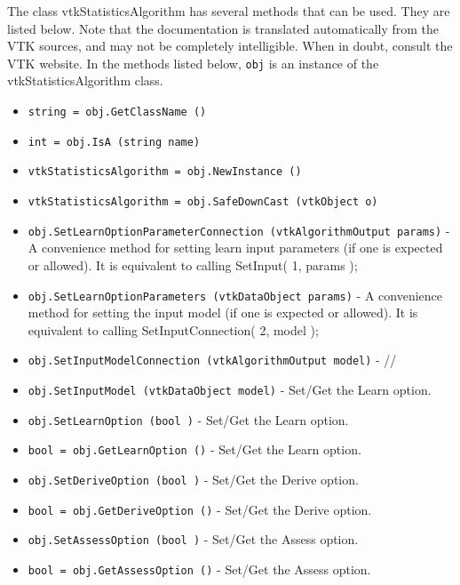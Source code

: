 The class vtkStatisticsAlgorithm has several methods that can be used.
  They are listed below.
Note that the documentation is translated automatically from the VTK sources,
and may not be completely intelligible.  When in doubt, consult the VTK website.
In the methods listed below, \verb|obj| is an instance of the vtkStatisticsAlgorithm class.
\begin{itemize}
\item  \verb|string = obj.GetClassName ()|

\item  \verb|int = obj.IsA (string name)|

\item  \verb|vtkStatisticsAlgorithm = obj.NewInstance ()|

\item  \verb|vtkStatisticsAlgorithm = obj.SafeDownCast (vtkObject o)|

\item  \verb|obj.SetLearnOptionParameterConnection (vtkAlgorithmOutput params)| -  A convenience method for setting learn input parameters (if one is expected or allowed).
 It is equivalent to calling SetInput( 1, params );

\item  \verb|obj.SetLearnOptionParameters (vtkDataObject params)| -  A convenience method for setting the input model (if one is expected or allowed).
 It is equivalent to calling SetInputConnection( 2, model );

\item  \verb|obj.SetInputModelConnection (vtkAlgorithmOutput model)| - // \item \verb|obj.SetInputModel (vtkDataObject model)| -  Set/Get the Learn option.

\item  \verb|obj.SetLearnOption (bool )| -  Set/Get the Learn option.

\item  \verb|bool = obj.GetLearnOption ()| -  Set/Get the Learn option.

\item  \verb|obj.SetDeriveOption (bool )| -  Set/Get the Derive option.

\item  \verb|bool = obj.GetDeriveOption ()| -  Set/Get the Derive option.

\item  \verb|obj.SetAssessOption (bool )| -  Set/Get the Assess option.

\item  \verb|bool = obj.GetAssessOption ()| -  Set/Get the Assess option.


\end{itemize}

